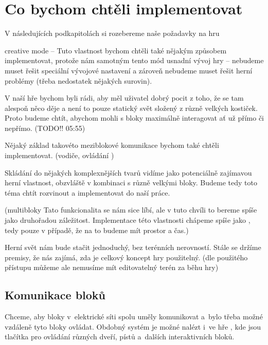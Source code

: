 


\section{Co bychom chtěli implementovat}

V následujících podkapitolách si rozebereme naše požadavky na hru



creative mode -- Tuto vlastnost bychom chtěli také nějakým způsobem implementovat, protože nám samotným tento mód usnadní vývoj hry -- nebudeme muset řešit speciální vývojové nastavení a zároveň nebudeme muset řešit herní problémy (třeba nedostatek nějakých surovin). 



V naší hře bychom byli rádi, aby měl uživatel dobrý pocit z toho, že se tam alespoň něco děje a není to pouze statický svět složený z různě velkých kostiček. Proto budeme chtít, abychom mohli s bloky maximálně interagovat ať už přímo či nepřímo. (TODO!! 05:55)


Nějaký základ takovéto meziblokové komunikace bychom také chtěli implementovat. (vodiče, ovládání )



Skládání do nějakých komplexnějších tvarů vidíme jako potenciálně zajímavou herní vlastnost, obzvláště v kombinaci s různě velkými bloky. Budeme tedy toto téma chtít rozvinout a implementovat do naší práce. 

(multibloky Tato funkcionalita se nám sice líbí, ale v tuto chvíli to bereme spíše jako druhořadou záležitost. Implementace této vlastnosti chápeme spíše jako , tedy pouze v případě, že na to budeme mít prostor a čas.)


Herní svět nám bude stačit jednoduchý, bez terénních nerovností. Stále se držíme premisy, že nás zajímá, zda je celkový koncept hry použitelný. (dle použitého přístupu můžeme ale nemusíme mít editovatelný terén za běhu hry)




\subsection{Komunikace bloků}

Chceme, aby bloky v~elektrické síti spolu uměly komunikovat a~bylo třeba možné vzdáleně tyto bloky ovládat. Obdobný systém je možné nalézt i~ve hře \SE{}, kde jsou tlačítka pro ovládání různých dveří, pístů a~dalších interaktivních bloků.


